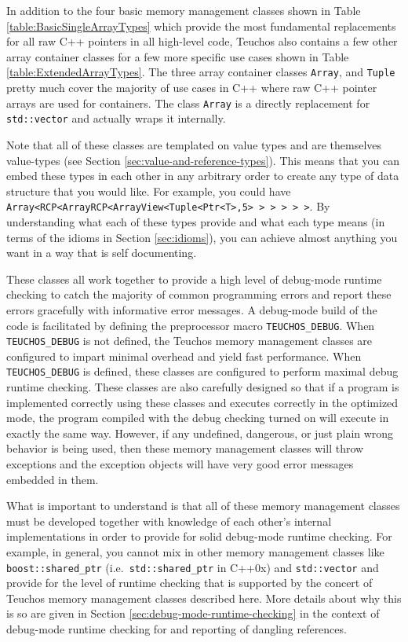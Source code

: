 \documentclass[pdf,ps2pdf,11pt]{SANDreport}
\begin{document}
In addition to the four basic memory management classes shown in Table
{}\ref{table:BasicSingleArrayTypes} which provide the most fundamental
replacements for all raw C++ pointers in all high-level code, Teuchos
also contains a few other array container classes for a few more
specific use cases shown in Table {}\ref{table:ExtendedArrayTypes}.
The three array container classes {}\texttt{Array}, and
{}\texttt{Tuple} pretty much cover the majority of use cases in C++
where raw C++ pointer arrays are used for containers.  The class
{}\texttt{Array} is a directly replacement for {}\texttt{std::vector}
and actually wraps it internally.

Note that all of these classes are templated on value types and are
themselves value-types (see Section
{}\ref{sec:value-and-reference-types}).  This means that you can
embed these types in each other in any arbitrary order to create any
type of data structure that you would like.  For example, you could
have {}\texttt{Array<RCP<ArrayRCP<ArrayView<Tuple<Ptr<T>,5> > > > >
>}.  By understanding what each of these types provide and what each
type means (in terms of the idioms in Section {}\ref{sec:idioms}), you
can achieve almost anything you want in a way that is self
documenting.

These classes all work together to provide a high level of debug-mode
runtime checking to catch the majority of common programming errors
and report these errors gracefully with informative error messages.  A
debug-mode build of the code is facilitated by defining the
preprocessor macro {}\texttt{TEUCHOS\_DEBUG}.  When
{}\texttt{TEUCHOS\_DEBUG} is not defined, the Teuchos memory
management classes are configured to impart minimal overhead and yield
fast performance.  When {}\texttt{TEUCHOS\_DEBUG} is defined, these
classes are configured to perform maximal debug runtime checking.
These classes are also carefully designed so that if a program is
implemented correctly using these classes and executes correctly in
the optimized mode, the program compiled with the debug checking
turned on will execute in exactly the same way.  However, if any
undefined, dangerous, or just plain wrong behavior is being used, then
these memory management classes will throw exceptions and the
exception objects will have very good error messages embedded in them.

What is important to understand is that all of these memory management
classes must be developed together with knowledge of each other's
internal implementations in order to provide for solid debug-mode
runtime checking.  For example, in general, you cannot mix in other
memory management classes like {}\texttt{boost::shared\_ptr} (i.e.\
{}\texttt{std::shared\_ptr} in C++0x) and {}\texttt{std::vector} and
provide for the level of runtime checking that is supported by the
concert of Teuchos memory management classes described here.  More
details about why this is so are given in Section
{}\ref{sec:debug-mode-runtime-checking} in the context of debug-mode
runtime checking for and reporting of dangling references.
\end{document}
